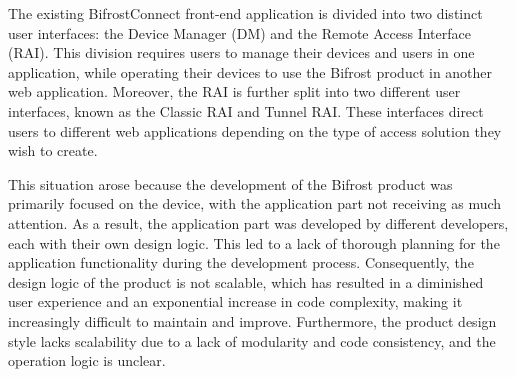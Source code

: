 The existing BifrostConnect front-end application is divided into two distinct user interfaces:
the Device Manager (DM) and the Remote Access Interface (RAI). 
This division requires users to manage their devices and users in one application, 
while operating their devices to use the Bifrost product in another web application. 
Moreover, the RAI is further split into two different user interfaces, 
known as the Classic RAI and Tunnel RAI. 
These interfaces direct users to different web applications 
depending on the type of access solution they wish to create.

This situation arose because the development of the Bifrost product was primarily focused 
on the device, with the application part not receiving as much attention. 
As a result, the application part was developed by different developers, 
each with their own design logic. 
This led to a lack of thorough planning for the application functionality 
during the development process. Consequently, 
the design logic of the product is not scalable, 
which has resulted in a diminished user experience 
and an exponential increase in code complexity, 
making it increasingly difficult to maintain and improve. 
Furthermore, the product design style lacks scalability due to a lack of modularity 
and code consistency, and the operation logic is unclear.
